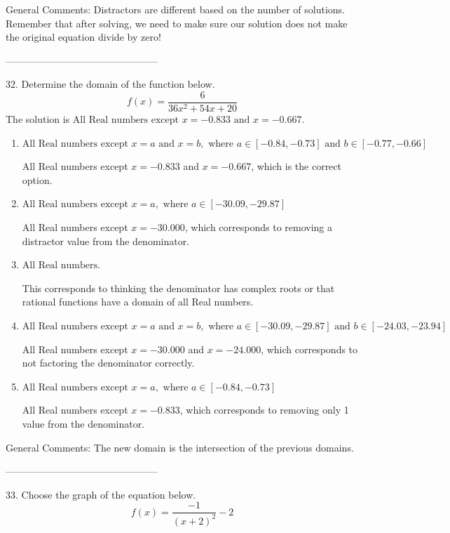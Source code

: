 \documentclass{article}[14pt]
\begin{document}
General Comments: Distractors are different based on the number of solutions. Remember that after solving, we need to make sure our solution does not make the original equation divide by zero!

-----------------------------------------------

32. Determine the domain of the function below.
$$ f(x) = \frac{6}{36x^{2} +54 x + 20} $$ 
The solution is $ \text{All Real numbers except } x = -0.833 \text{ and } x = -0.667. $ 

\begin{enumerate}[label=\Alph*.] 
\item $ \text{All Real numbers except } x = a \text{ and } x = b, \text{ where } a \in [-0.84, -0.73] \text{ and } b \in [-0.77, -0.66] $ 

 All Real numbers except $x = -0.833$ and $x = -0.667$, which is the correct option. 
\item $ \text{All Real numbers except } x = a, \text{ where } a \in [-30.09, -29.87] $ 

 All Real numbers except $x = -30.000$, which corresponds to removing a distractor value from the denominator. 
\item $ \text{All Real numbers.} $ 

 This corresponds to thinking the denominator has complex roots or that rational functions have a domain of all Real numbers. 
\item $ \text{All Real numbers except } x = a \text{ and } x = b, \text{ where } a \in [-30.09, -29.87] \text{ and } b \in [-24.03, -23.94] $ 

 All Real numbers except $x = -30.000$ and $x = -24.000$, which corresponds to not factoring the denominator correctly. 
\item $ \text{All Real numbers except } x = a, \text{ where } a \in [-0.84, -0.73] $ 

 All Real numbers except $x = -0.833$, which corresponds to removing only 1 value from the denominator. 
\end{enumerate} 
 
General Comments: The new domain is the intersection of the previous domains.

-----------------------------------------------

33. Choose the graph of the equation below.
$$ f(x) = \frac{-1}{(x + 2)^2} - 2 $$ 
\end{document}
